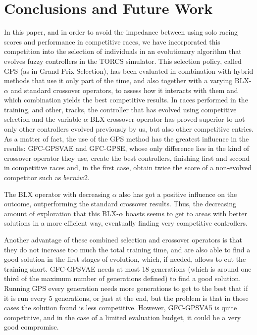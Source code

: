 \documentclass[10pt,journal,compsoc]{IEEEtran}
\begin{document}
\section{Conclusions and Future Work}
\label{sec:conclusions}

In this paper, and in order to avoid the impedance between using solo
racing scores and performance in competitive races, we have
incorporated this competition into the selection of individuals in an
evolutionary algorithm that evolves fuzzy controllers in the TORCS
simulator. This selection policy, called GPS (as in Grand Prix
Selection), has been evaluated in combination with hybrid methods that
use it only part of the time, and also together with a varying
BLX-$\alpha$ and standard crossover operators, to assess how it
interacts with them and which combination yields the best competitive
results.
	In races performed in the training, and other, tracks, the controller
that has evolved using competitive selection and the
variable-$\alpha$ BLX crossover operator has proved superior to not
only other controllers evolved previously by us, but also other
competitive entries. As a matter of fact, the use of the GPS method has the greatest
influence in the results: {\sf GFC-GPSVAE} and {\sf GFC-GPSE}, whose only
difference lies in the kind of crossover operator they use, create the
best controllers, finishing first and second in competitive races and,
in the first case, obtain twice the score of a non-evolved
competitor such as $berniw2$.

The  BLX operator with decreasing $\alpha$ also has got a positive
influence on the outcome, outperforming the standard crossover
results. Thus, the decreasing amount of exploration that this BLX-$\alpha$ boasts seems to get to areas with better solutions in a
more efficient way, eventually finding very competitive controllers.

Another advantage of these combined selection and crossover operators is that they do not
increase too much the total training time, and are also able to find a
good solution in the first stages of evolution, which, if needed,
allows to cut the training short. {\sf GFC-GPSVAE} needs at most 18
generations (which is around one third of the maximum number of
generations defined) to find a good solution. Running GPS every
generation needs more generations to get to the best that if it is run
every 5 generations, or just at the end, but the problem is that in
those cases the solution found is less competitive. However, {\sf
  GFC-GPSVA5} is quite competitive, and in the case of a limited
evaluation budget, it could be a very good compromise.
\end{document}
